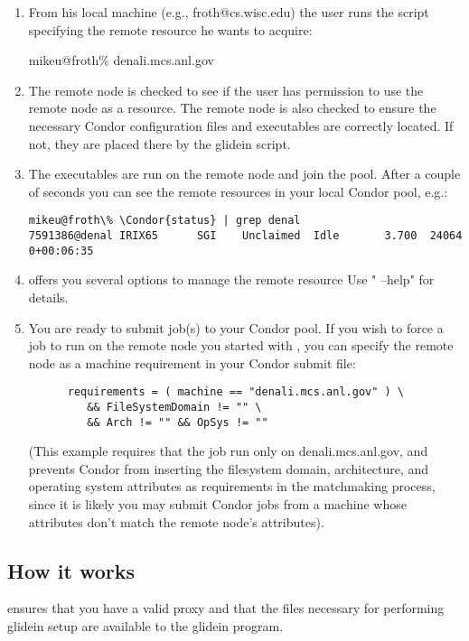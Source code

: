 \begin{enumerate}

\item From his local machine (e.g., froth@cs.wisc.edu) the user runs 
   the  script specifying the remote resource he wants 
   to acquire:

mikeu@froth\%  denali.mcs.anl.gov

\item The remote node is checked to see if the user has permission to
   use the remote node as a resource. The remote node is also checked
   to ensure the necessary Condor configuration files and executables
   are correctly located. If not, they are placed there by the glidein
   script.

\item The executables are run on the remote node and join the pool.
   After a couple of seconds you can see the remote resources in your 
   local Condor pool, e.g.:

\begin{verbatim}
mikeu@froth\% \Condor{status} | grep denal
7591386@denal IRIX65      SGI    Unclaimed  Idle       3.700  24064  0+00:06:35
\end{verbatim}

\item {} offers you several options to manage the remote resource
   Use " --help" for details.

\item You are ready to submit job(s) to your Condor pool. If you wish to force
   a job to run on the remote node you started with , you can
   specify the remote node as a machine requirement in your Condor submit
   file: 
\begin{verbatim}
      requirements = ( machine == "denali.mcs.anl.gov" ) \
         && FileSystemDomain != "" \
         && Arch != "" && OpSys != ""
\end{verbatim}
   (This example requires that the job run only on denali.mcs.anl.gov, and
   prevents Condor from inserting the filesystem domain, architecture, and 
   operating system attributes as requirements in the matchmaking process,
   since it is likely you may submit Condor jobs from a machine whose
   attributes don't match the remote node's attributes).

\end{enumerate}

\subsection{How it works}
 ensures that you have a valid proxy and that the files
necessary for performing glidein setup are available to the glidein
program. 

